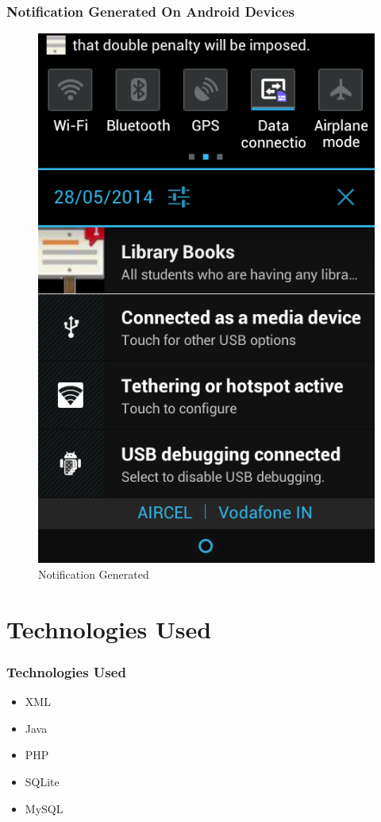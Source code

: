 \documentclass{beamer}   %
\begin{document}
\begin{frame}
\frametitle{Notification Generated On Android Devices}
\begin{figure}
\includegraphics[scale=0.2]{image/notify.png}
\caption{Notification Generated}
\end{figure}
\end{frame}

\section{Technologies Used}
\begin{frame}
\frametitle{Technologies Used}
\begin{itemize}
\item XML\pause
\item Java\pause
\item PHP\pause
\item SQLite \pause
\item MySQL\pause
\end{itemize}
\end{frame}
\end{document}
